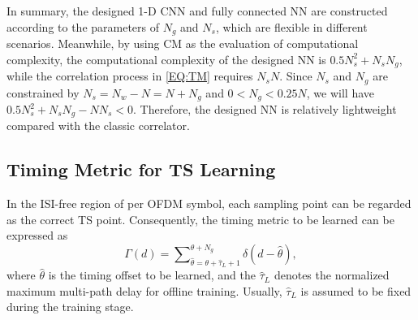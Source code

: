 \documentclass[conference]{IEEEtran}
\begin{document}
In summary, the designed 1-D CNN and fully connected NN are constructed according to the parameters of $N_g$ and $N_s$, which are flexible in different scenarios. Meanwhile, by using CM as the evaluation of computational complexity, the computational complexity of the designed NN is $0.5N^2_s+N_sN_g$, while the correlation process in \eqref{EQ:TM} requires $N_sN$.
Since $N_s$ and $N_g$ are constrained by $N_s=N_w-N=N+N_g$ and $0<N_g<0.25N$, we will have $0.5N^2_s+N_sN_g-NN_s<0$.
Therefore, the designed NN is relatively lightweight compared with the classic correlator\cite{ref:CC}.
\vspace{-2mm}

\subsection{Timing Metric for TS Learning}
In the ISI-free region of per OFDM symbol, each sampling point can be regarded as the correct TS point\cite{ref:ISIf3}.
Consequently, the timing metric to be learned can be expressed as
\begin{equation}\label{EQ:Label1}
\Gamma \left( d \right) = \sum\nolimits_{\hat \theta  = {\theta+\hat\tau _L+1}}^{{\theta+N_g}} {\delta \left( {d - \hat \theta } \right)},
\end{equation}
where $ \hat \theta$ is the timing offset to be learned, and the $\hat \tau _L$ denotes the normalized maximum multi-path delay for offline training.
Usually, $\hat \tau_L$ is assumed to be fixed during the training stage.
\end{document}
